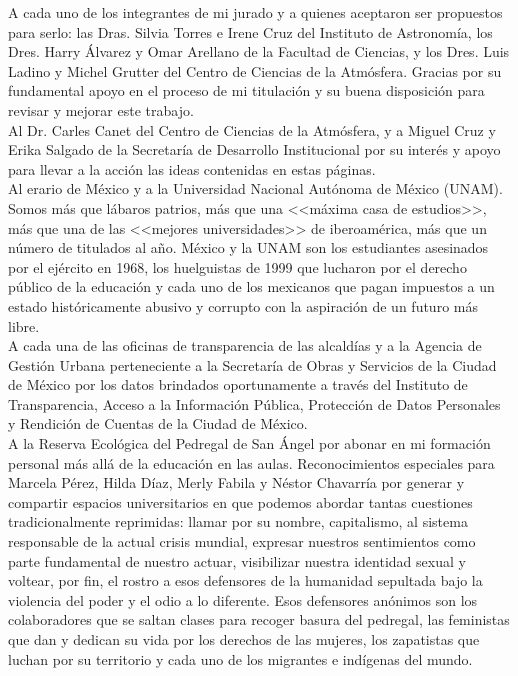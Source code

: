 A cada uno de los integrantes de mi jurado y a quienes aceptaron ser propuestos para serlo: las Dras. Silvia Torres e Irene Cruz del Instituto de Astronomía, los Dres. Harry Álvarez y Omar Arellano de la Facultad de Ciencias, y los Dres. Luis Ladino y Michel Grutter del Centro de Ciencias de la Atmósfera. Gracias por su fundamental apoyo en el proceso de mi titulación y su buena disposición para revisar y mejorar este trabajo.\\

Al Dr. Carles Canet del Centro de Ciencias de la Atmósfera, y a Miguel Cruz y Erika Salgado de la Secretaría de Desarrollo Institucional por su interés y apoyo para llevar a la acción las ideas contenidas en estas páginas.\\

Al erario de México y a la Universidad Nacional Autónoma de México (UNAM). Somos más que lábaros patrios, más que una <<máxima casa de estudios>>, más que una de las <<mejores universidades>> de iberoamérica, más que un número de titulados al año. México y la UNAM son los estudiantes asesinados por el ejército en 1968, los huelguistas de 1999 que lucharon por el derecho público de la educación y cada uno de los mexicanos que pagan impuestos a un estado históricamente abusivo y corrupto con la aspiración de un futuro más libre.\\

A cada una de las oficinas de transparencia de las alcaldías y a la Agencia de Gestión Urbana perteneciente a la Secretaría de Obras y Servicios de la Ciudad de México  por los datos brindados oportunamente a través del Instituto de Transparencia, Acceso a la Información Pública, Protección de Datos Personales y Rendición de Cuentas de la Ciudad de México.\\

A la Reserva Ecológica del Pedregal de San Ángel por abonar en mi formación personal más allá de la educación en las aulas. Reconocimientos especiales para Marcela Pérez, Hilda Díaz, Merly Fabila y Néstor Chavarría por generar y compartir espacios universitarios en que podemos abordar tantas cuestiones tradicionalmente reprimidas: llamar por su nombre, capitalismo, al sistema responsable de la actual crisis mundial, expresar nuestros sentimientos como parte fundamental de nuestro actuar, visibilizar nuestra identidad sexual y voltear, por fin, el rostro a esos defensores de la humanidad sepultada bajo la violencia del poder y el odio a lo diferente. Esos defensores anónimos son los colaboradores que se saltan clases para recoger basura del pedregal, las feministas que dan y dedican su vida por los derechos de las mujeres, los zapatistas que luchan por su territorio y cada uno de los migrantes e indígenas del mundo.\\

